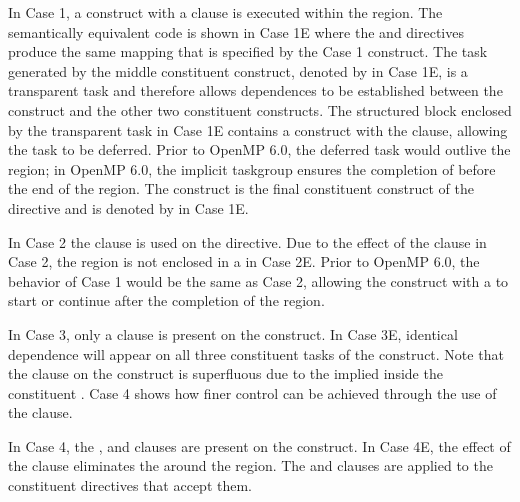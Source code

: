 In Case 1, a  construct with a  clause is executed within 
the  region. 
The semantically equivalent code is shown in Case 1E 
where the  and  directives produce 
the same mapping that is specified by the Case 1  construct.
The task generated by the middle constituent construct, denoted by  in Case 1E, 
is a transparent task and therefore allows dependences to be established between the 
 construct and the other two constituent constructs.
The structured block enclosed by the transparent task in Case 1E contains a  construct 
with the  clause, allowing the task  to be deferred. 
Prior to OpenMP 6.0, the deferred task  would outlive the  region;
in OpenMP 6.0, the implicit taskgroup ensures the completion of  before
the end of the  region.
The  construct is the final constituent construct of the  
directive and is denoted by  in Case 1E.  

In Case 2 the  clause is used on the  directive.
Due to the effect of the  clause in Case 2, the  region is not enclosed in 
a  in Case 2E. 
Prior to OpenMP 6.0, the behavior of Case 1 would be the same as Case 2, 
allowing the  construct with a  to start or continue after the completion of the 
 region.

In Case 3, only a  clause is present on the  construct. 
In Case 3E, identical dependence will appear on all three constituent tasks of the  
construct.
Note that the  clause on the  construct is superfluous 
due to the implied  inside the constituent . Case 4 shows 
how finer control can be achieved through the use of the  clause.

In Case 4, the ,  and  clauses are present on 
the  construct. 
In Case 4E, the effect of the  clause eliminates the  around 
the  region. 
The  and  clauses are applied to the constituent directives that 
accept them. 

